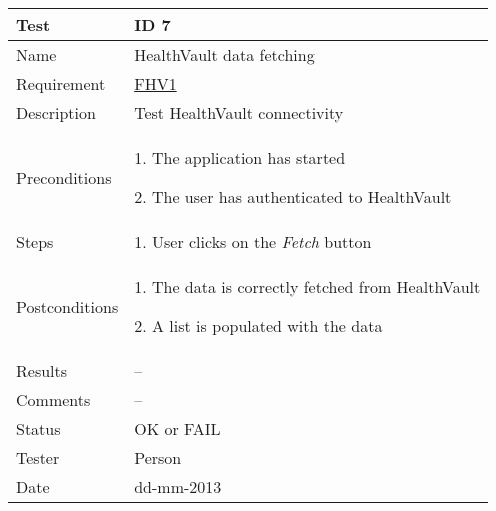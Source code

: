 \begin{table}
\begin{center}
\begin{tabular}{ | l | p{10cm} | }
	\hline
	\textbf{Test}	&	\textbf{ID 7} \\
	\hline\noalign{\smallskip}\noalign{\smallskip}\hline
	Name				& HealthVault data fetching \\
	Requirement			& \hyperref[table:reqweight]{FHV1} \\
	Description			& Test HealthVault connectivity \\
	Preconditions		&	\par 1. The application has started
							\par 2. The user has authenticated to HealthVault \\
	Steps 				&	\par 1. User clicks on the \textit{Fetch} button \\
	Postconditions		&	\par 1. The data is correctly fetched from HealthVault
							\par 2. A list is populated with the data \\
	Results				& -- \\
	Comments			& -- \\
	Status				& OK or FAIL\\
	Tester				& Person \\
	Date				& dd-mm-2013 \\
	\hline
\end{tabular}
\end{center}
\end{table}

